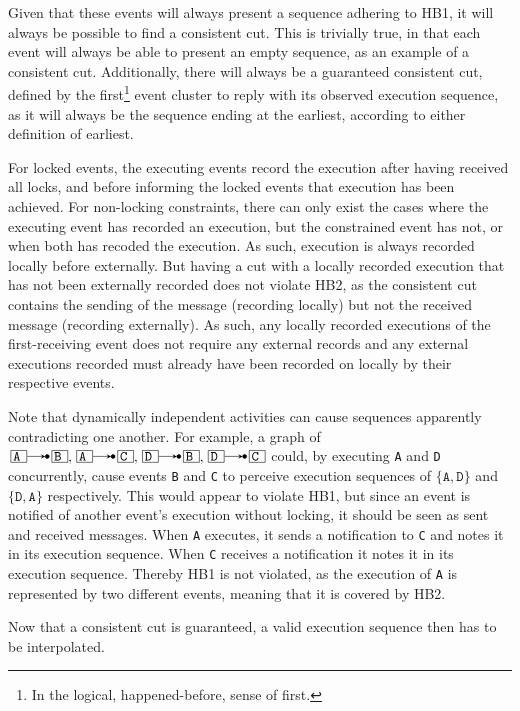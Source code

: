 \documentclass{article}
\begin{document}
	Given that these events will always present a sequence adhering to HB1, it will always be possible to find a consistent cut.
	This is trivially true, in that each event will always be able to present an empty sequence, as an example of a consistent cut.
	Additionally, there will always be a guaranteed consistent cut, defined by the first\footnote{In the logical, happened-before, sense of first.} event cluster to reply with its observed execution sequence, as it will always be the sequence ending at the earliest, according to either definition of earliest.

	For locked events, the executing events record the execution after having received all locks, and before informing the locked events that execution has been achieved.
	For non-locking constraints, there can only exist the cases where the executing event has recorded an execution, but the constrained event has not, or when both has recoded the execution.
	As such, execution is always recorded locally before externally.
	But having a cut with a locally recorded execution that has not been externally recorded does not violate HB2, as the consistent cut contains the sending of the message (recording locally) but not the received message (recording externally).
	As such, any locally recorded executions of the first-receiving event does not require any external records and any external executions recorded must already have been recorded on locally by their respective events.

	Note that dynamically independent activities can cause sequences apparently contradicting one another.
	For example, a graph of $\ev{A} \crel \ev{B}, \ev{A} \crel \ev{C}, \ev{D} \crel \ev{B}, \ev{D} \crel \ev{C}$ could, by executing \texttt{A} and \texttt{D} concurrently, cause events \texttt{B} and \texttt{C} to perceive execution sequences of $\{\texttt{A}, \texttt{D}\}$ and $\{\texttt{D}, \texttt{A}\}$ respectively.
	This would appear to violate HB1, but since an event is notified of another event's execution without locking, it should be seen as sent and received messages.
	When \texttt{A} executes, it sends a notification to \texttt{C} and notes it in its execution sequence.
	When \texttt{C} receives a notification it notes it in its execution sequence.
	Thereby HB1 is not violated, as the execution of \texttt{A} is represented by two different events, meaning that it is covered by HB2.

	Now that a consistent cut is guaranteed, a valid execution sequence then has to be interpolated.
\end{document}
